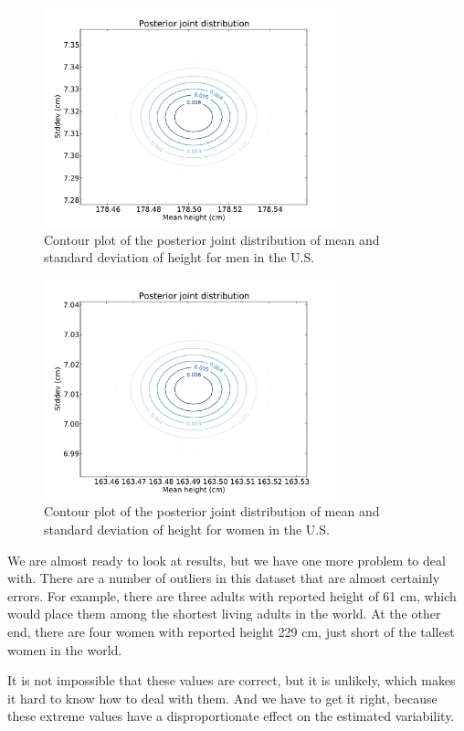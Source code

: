 \documentclass[12pt]{book}
\theoremstyle{exercise}
\begin{document}
\begin{figure}
\centerline{\includegraphics[height=2.5in]{figs/variability_posterior_male.pdf}}
\caption{Contour plot of the posterior joint distribution of
mean and standard deviation of height for men in the U.S.}
\label{fig.variability1}
\end{figure}

\begin{figure}
\centerline{\includegraphics[height=2.5in]{figs/variability_posterior_female.pdf}}
\caption{Contour plot of the posterior joint distribution of
mean and standard deviation of height for women in the U.S.}
\label{fig.variability2}
\end{figure}

We are almost ready to look at results, but we have one more
problem to deal with.  There are a number of outliers in this
dataset that are almost certainly errors.  For example, there
are three adults with reported height of 61 cm, which would
place them among the shortest living adults in the world.
At the other end, there are four women with reported height
229 cm, just short of the tallest women in the world.

It is not impossible that these values are correct, but it is
unlikely, which makes it hard to know how to deal with them.
And we have to get
it right, because these extreme values have a disproportionate
effect on the estimated variability.
\end{document}
